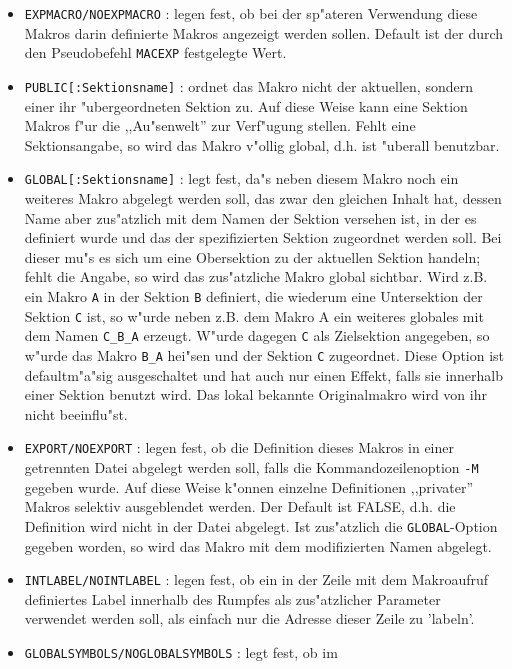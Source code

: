 \documentclass[12pt,a4paper,twoside]{report}
\newcommand{\tty}[1]{{\tt #1}}
\begin{document}
{\begin{itemize}
\item{\tty{EXPMACRO/NOEXPMACRO} : legen fest, ob bei der sp"ateren
      Verwendung diese Makros darin definierte Makros angezeigt werden
      sollen.  Default ist der durch den Pseudobefehl \tty{MACEXP}
      festgelegte Wert.}
\item{\tty{PUBLIC[:Sektionsname]} : ordnet das Makro nicht der
      aktuellen, sondern einer ihr "ubergeordneten Sektion zu.
      Auf diese Weise kann eine Sektion Makros f"ur die ,,Au"senwelt''
      zur Verf"ugung stellen.  Fehlt eine Sektionsangabe, so wird das
      Makro v"ollig global, d.h. ist "uberall benutzbar.}
\item{\tty{GLOBAL[:Sektionsname]} : legt fest, da"s neben diesem
      Makro noch ein weiteres Makro abgelegt werden soll, das zwar
      den gleichen Inhalt hat, dessen Name aber zus"atzlich mit dem
      Namen der Sektion versehen ist, in der es definiert wurde und
      das der spezifizierten Sektion zugeordnet werden soll.  Bei
      dieser mu"s es sich um eine Obersektion zu der aktuellen Sektion
      handeln; fehlt die Angabe, so wird das zus"atzliche Makro
      global sichtbar.  Wird z.B. ein Makro \tty{A} in der Sektion \tty{B}
      definiert, die wiederum eine Untersektion der Sektion \tty{C} ist,
      so w"urde neben z.B. dem Makro A ein weiteres globales mit dem
      Namen \tty{C\_B\_A} erzeugt.  W"urde dagegen \tty{C} als Zielsektion
      angegeben, so w"urde das Makro \tty{B\_A} hei"sen und der Sektion
      \tty{C} zugeordnet.  Diese Option ist defaultm"a"sig ausgeschaltet und
      hat auch nur einen Effekt, falls sie innerhalb einer Sektion
      benutzt wird.  Das lokal bekannte Originalmakro wird von ihr
      nicht beeinflu"st.}
\item{\tty{EXPORT/NOEXPORT} : legen fest, ob die Definition dieses
      Makros in einer getrennten Datei abgelegt werden soll, falls
      die Kommandozeilenoption \tty{-M} gegeben wurde.  Auf diese
      Weise k"onnen einzelne Definitionen ,,privater'' Makros selektiv
      ausgeblendet werden.  Der Default ist FALSE, d.h. die Definition
      wird nicht in der Datei abgelegt.  Ist zus"atzlich die
      \tty{GLOBAL}-Option gegeben worden, so wird das Makro mit dem
      modifizierten Namen abgelegt.}
\item{\tty{INTLABEL/NOINTLABEL} : legen fest, ob ein in der Zeile mit
      dem Makroaufruf definiertes Label innerhalb des Rumpfes als
      zus"atzlicher Parameter verwendet werden soll, als einfach
      nur die Adresse dieser Zeile zu 'labeln'.}
\item{\tty{GLOBALSYMBOLS/NOGLOBALSYMBOLS} : legt fest, ob im
}
\end{itemize}}
\end{document}
